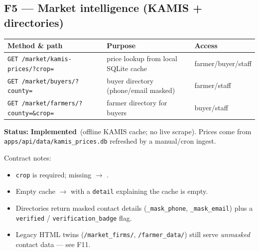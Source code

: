 \documentclass[11pt,a4paper]{article}
\newcommand{\done}{\textcolor{statusdone}{\textbf{Implemented}}}
\newcommand{\code}[1]{\texttt{\allowbreak #1\allowbreak}}
\begin{document}
\subsection{F5 --- Market intelligence (KAMIS + directories)}
\begin{center}
\small
\begin{tabularx}{\textwidth}{@{} l X l @{}}
\toprule
\textbf{Method \& path} & \textbf{Purpose} & \textbf{Access} \\
\midrule
\code{GET /market/kamis-prices/?crop=} & price lookup from local SQLite cache & farmer/buyer/staff \\
\code{GET /market/buyers/?county=}     & buyer directory (phone/email masked) & farmer/staff \\
\code{GET /market/farmers/?county=\&crop=} & farmer directory for buyers & buyer/staff \\
\bottomrule
\end{tabularx}
\end{center}

\textbf{Status:} \done\ (offline KAMIS cache; no live scrape). Prices come
from \code{apps/api/data/kamis\_prices.db} refreshed by a manual/cron
ingest.

Contract notes:
\begin{itemize}
  \item \code{crop} is required; missing $\rightarrow$ \code{400}.
  \item Empty cache $\rightarrow$ \code{503} with a \code{detail} explaining
        the cache is empty.
  \item Directories return masked contact details
        (\code{\_mask\_phone}, \code{\_mask\_email}) plus a \code{verified} /
        \code{verification\_badge} flag.
  \item Legacy HTML twins (\code{/market\_firms/}, \code{/farmer\_data/})
        still serve \emph{unmasked} contact data --- see F11.
\end{itemize}

\end{document}
